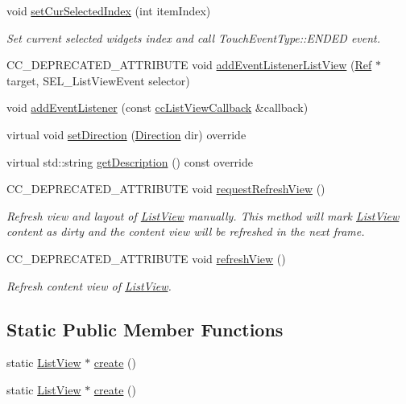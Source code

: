 \begin{DoxyCompactItemize}
void \hyperlink{classui_1_1ListView_a087e340d27a4f774c63b5b8dadd4206a}{set\+Cur\+Selected\+Index} (int item\+Index)
\begin{DoxyCompactList}\small\item\em Set current selected widget\textquotesingle{}s index and call Touch\+Event\+Type\+::\+E\+N\+D\+ED event. \end{DoxyCompactList}\item 
C\+C\+\_\+\+D\+E\+P\+R\+E\+C\+A\+T\+E\+D\+\_\+\+A\+T\+T\+R\+I\+B\+U\+TE void \hyperlink{classui_1_1ListView_ad2a7ee403cd9f7559f99e34046c1a8bb}{add\+Event\+Listener\+List\+View} (\hyperlink{classRef}{Ref} $\ast$target, S\+E\+L\+\_\+\+List\+View\+Event selector)
\item 
void \hyperlink{classui_1_1ListView_ac9579703c37e0c23eba035fe31e00ba5}{add\+Event\+Listener} (const \hyperlink{classui_1_1ListView_ac67b2dd17d792bb61a9020b3935ffc79}{cc\+List\+View\+Callback} \&callback)
\item 
virtual void \hyperlink{classui_1_1ListView_aa4999666131727cdb1a32f13957914e3}{set\+Direction} (\hyperlink{classui_1_1ScrollView_aed2d778ae8098dcafe323b2beae8dd6b}{Direction} dir) override
\item 
virtual std\+::string \hyperlink{classui_1_1ListView_a921a755d9787f976af9424ceb16a1aa3}{get\+Description} () const override
\item 
C\+C\+\_\+\+D\+E\+P\+R\+E\+C\+A\+T\+E\+D\+\_\+\+A\+T\+T\+R\+I\+B\+U\+TE void \hyperlink{classui_1_1ListView_a4c022c87acd7ba5ddaaae7a3f0dac170}{request\+Refresh\+View} ()
\begin{DoxyCompactList}\small\item\em Refresh view and layout of \hyperlink{classui_1_1ListView}{List\+View} manually. This method will mark \hyperlink{classui_1_1ListView}{List\+View} content as dirty and the content view will be refreshed in the next frame. \end{DoxyCompactList}\item 
C\+C\+\_\+\+D\+E\+P\+R\+E\+C\+A\+T\+E\+D\+\_\+\+A\+T\+T\+R\+I\+B\+U\+TE void \hyperlink{classui_1_1ListView_a2bf4b49c5d219112bf5690b891ea9cad}{refresh\+View} ()
\begin{DoxyCompactList}\small\item\em Refresh content view of \hyperlink{classui_1_1ListView}{List\+View}. \end{DoxyCompactList}\end{DoxyCompactItemize}
\subsection*{Static Public Member Functions}
\begin{DoxyCompactItemize}
\item 
static \hyperlink{classui_1_1ListView}{List\+View} $\ast$ \hyperlink{classui_1_1ListView_a5dc4e7e3fe7c954a4b07ea53bd40ca97}{create} ()
\item 
static \hyperlink{classui_1_1ListView}{List\+View} $\ast$ \hyperlink{classui_1_1ListView_a31ae9f031409d417a2079fc73d220703}{create} ()
\end{DoxyCompactItemize}
